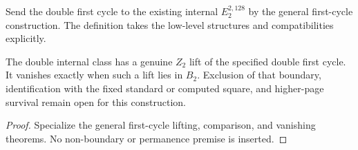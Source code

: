 \begin{definition}
  \label{def:h6-double-internal-second-page}
  \leanok
  Send the double first cycle to the existing internal $E_2^{2,128}$
  by the general first-cycle construction. The definition takes the
  low-level structures and compatibilities explicitly.
\end{definition}

\begin{proposition}
  \label{prop:h6-double-internal-representative}
  \leanok
  The double internal class has a genuine $Z_2$ lift of the specified
  double first cycle. It vanishes exactly when such a lift lies in $B_2$.
  Exclusion of that boundary, identification with the fixed standard or
  computed square, and higher-page survival remain open for this construction.
\end{proposition}
\begin{proof}
  Specialize the general first-cycle lifting, comparison, and vanishing
  theorems. No non-boundary or permanence premise is inserted.
  \leanok
\end{proof}

